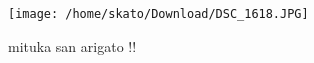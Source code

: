 \documentclass[a4paper,11pt]{jsarticle}
\begin{document}
\title{}
\author{}
\date{\today}
\maketitle

\begin{figure}[htbp]
\centering
\texttt{[image: /home/skato/Download/DSC\_1618.JPG]} %
\caption{mituka san arigato !!}
\label{fig:image1}
\end{figure}
\end{document}
